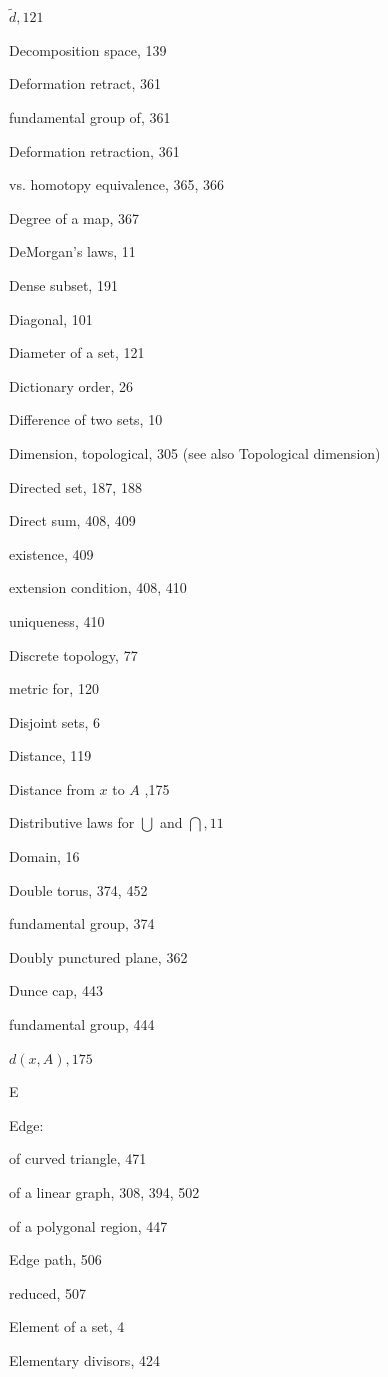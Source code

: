 \(\widetilde{d},{121}\)

Decomposition space, 139

Deformation retract, 361

fundamental group of, 361

Deformation retraction, 361

vs. homotopy equivalence, 365, 366

Degree of a map, 367

DeMorgan's laws, 11

Dense subset, 191

Diagonal, 101

Diameter of a set, 121

Dictionary order, 26

Difference of two sets, 10

Dimension, topological, 305 (see also Topological dimension)

Directed set, 187, 188

Direct sum, 408, 409

existence, 409

extension condition, 408, 410

uniqueness, 410

Discrete topology, 77

metric for, 120

Disjoint sets, 6

Distance, 119

Distance from \(x\) to \(A\) ,175

Distributive laws for \(\bigcup\) and \(\bigcap ,{11}\)

Domain, 16

Double torus, 374, 452

fundamental group, 374

Doubly punctured plane, 362

Dunce cap, 443

fundamental group, 444

\(d\left( {x,A}\right) ,{175}\)

E

Edge:

of curved triangle, 471

of a linear graph, 308, 394, 502

of a polygonal region, 447

Edge path, 506

reduced, 507

Element of a set, 4

Elementary divisors, 424

